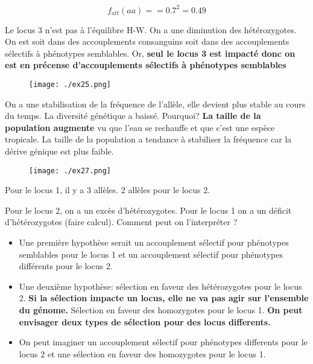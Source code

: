 \documentclass{article}
\begin{document}
\begin{equation}
f_{att}(aa) =  = 0.7^2 = 0.49
\end{equation}

Le locus 3 n'est pas à l'équilibre H-W. On a une diminution des hétérozygotes. On est soit dans des accouplements consanguins soit dans des accouplements sélectifs à phénotypes semblables. Or, \textbf{seul le locus 3 est impacté donc on est en précense d'accouplements sélectifs à phénotypes semblables}

\begin{figure}[H]
\texttt{[image: ./ex25.png]}
\end{figure}


On a une stabilisation de la fréquence de l'allèle, elle devient plus stable au cours du temps. La diversité génétique a baissé. Pourquoi? \textbf{La taille de la population augmente} vu que l'eau se rechauffe et que c'est une espèce tropicale. La taille de la population a tendance à stabiliser la fréquence car la dérive génique est plus faible. 

\pagebreak

\begin{figure}[H]
\texttt{[image: ./ex27.png]}
\end{figure}

Pour le locus 1, il y a 3 allèles. 2 allèles pour le locus 2.

Pour le locus 2, on a un excès d'hétérozygotes. Pour le locus 1 on a un déficit d'hétérozygotes (faire calcul). Comment peut on l'interpréter ? 


\begin{itemize}
\item Une première hypothèse serait un accouplement sélectif pour phénotypes semblables pour le locus 1 et un accouplement sélectif pour phénotypes différents pour le locus 2.

\item Une deuxième hypothèse: sélection en faveur des hétérozygotes pour le locus 2. \textbf{Si la sélection impacte un locus, elle ne va pas agir sur l'ensemble du génome.} Sélection en faveur des homozygotes pour le locus 1. \textbf{On peut envisager deux types de sélection pour des locus differents.}

\item On peut imaginer un accouplement sélectif pour phénotypes differents pour le locus 2 et une sélection en faveur des homozygotes pour le locus 1.
\end{itemize}
\end{document}
